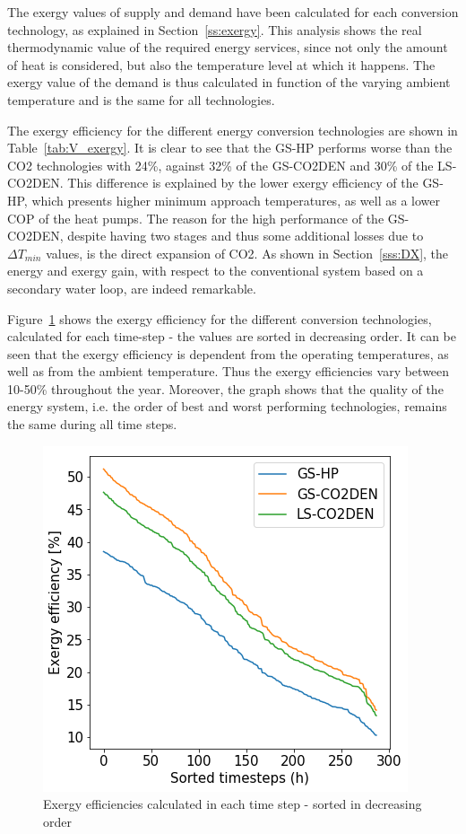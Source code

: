 \documentclass{article}
\begin{document}


The exergy values of supply and demand have been calculated for each conversion technology, as explained in Section~\ref{ss:exergy}. This analysis shows the real thermodynamic value of the required energy services, since not only the amount of heat is considered, but also the temperature level at which it happens. The exergy value of the demand is thus calculated in function of the varying ambient temperature and is the same for all technologies.

The exergy efficiency for the different energy conversion technologies are shown in Table~\ref{tab:V_exergy}. It is clear to see that the GS-HP performs worse than the CO2 technologies with 24\%, against 32\% of the GS-CO2DEN and 30\% of the LS-CO2DEN. This difference is explained by the lower exergy efficiency of the GS-HP, which presents higher minimum approach temperatures, as well as a lower COP of the heat pumps. The reason for the high performance of the GS-CO2DEN, despite having two stages and thus some additional losses due to $\Delta T_{min}$ values, is the direct expansion of CO2. As shown in Section~\ref{sss:DX}, the energy and exergy gain, with respect to the conventional system based on a secondary water loop, are indeed remarkable.



Figure~\ref{fig:v_exe} shows the exergy efficiency for the different conversion technologies, calculated for each time-step - the values are sorted in decreasing order. It can be seen that the exergy efficiency is dependent from the operating temperatures, as well as from the ambient temperature. Thus the exergy efficiencies vary between 10-50\% throughout the year. Moreover, the graph shows that the quality of the energy system, i.e. the order of best and worst performing technologies, remains the same during all time steps.

\begin{figure}[tph]
	\centering
	\includegraphics[width=0.5\linewidth]{exe}
	\caption{Exergy efficiencies calculated in each time step - sorted in decreasing order}
	\label{fig:v_exe}
\end{figure}
\end{document}
